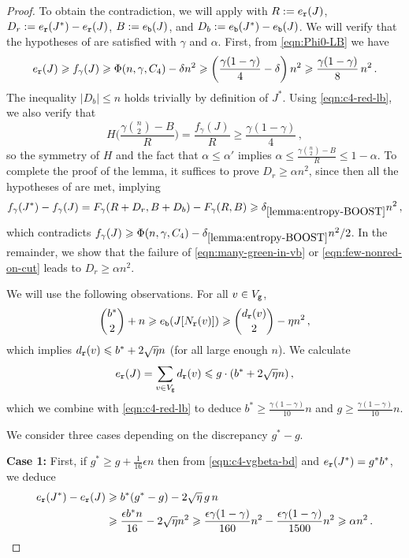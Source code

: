 \begin{proof}
To obtain the contradiction, we will apply  with $R:=e_\red(J)$, $D_r:=e_\red(J^\ast)-e_\red(J)$, $B:=e_\blue(J)$, and $D_b:=e_\blue(J^\ast)-e_\blue(J)$. We will verify that the hypotheses of  are satisfied with $\gamma$ and $\alpha$. First, from \eqref{eqn:Phi0-LB} we have
\begin{equation}\label{eqn:c4-red-lb}
e_\red(J)\geq f_\gamma(J)\geq\Phi(n,\gamma,C_4)-\delta n^2\geq\left(\frac{\gamma(1-\gamma)}{4}-\delta\right)n^2\geq\frac{\gamma(1-\gamma)}{8}\,n^2\,.
\end{equation}
The inequality $|D_b|\leq n$ holds trivially by definition of $J^\ast$. Using \eqref{eqn:c4-red-lb}, we also verify that
$$H\bigg(\frac{\gamma\binom{n}{2}-B}{R}\bigg)=\frac{f_\gamma(J)}{R}\geq\frac{\gamma(1-\gamma)}{4}\,,$$
so the symmetry of $H$ and the fact that $\alpha\leq\alpha'$ implies $\alpha\leq\frac{\gamma\binom{n}{2}-B}{R}\leq1-\alpha$. To complete the proof of the lemma, it suffices to prove $D_r\geq\alpha n^2$, since then all the hypotheses of  are met, implying
$$f_\gamma(J^\ast)-f_\gamma(J)=F_\gamma(R+D_r,B+D_b)-F_\gamma(R,B)\geq\delta_{\ref{lemma:entropy-BOOST}} n^2\,,$$
which contradicts $f_\gamma(J)\geq\Phi(n,\gamma,C_4)-\delta_{\ref{lemma:entropy-BOOST}}n^2/2$. In the remainder, we show that the failure of \eqref{eqn:many-green-in-vb} or \eqref{eqn:few-nonred-on-cut} leads to $D_r\geq\alpha n^2$.

We will use the following observations. For all $v\in V_\green$,
$$\binom{b^\ast}{2}+n\geq e_\blue(J[N_\red(v)])\geq\binom{d_\red(v)}{2}-\eta n^2\,,$$
which implies $d_\red(v)\leq b^\ast+2\sqrt{\eta}n$ (for all large enough $n$). We calculate
\begin{equation}\label{eqn:c4-vgbeta-bd}
e_\red(J)=\sum_{v\in V_\green}d_\red(v)\leq g\cdot(b^\ast+2\sqrt{\eta}n)\,,
\end{equation}
which we combine with \eqref{eqn:c4-red-lb} to deduce $b^\ast\geq\frac{\gamma(1-\gamma)}{10}n$ and $g\geq\frac{\gamma(1-\gamma)}{10}n$.

We consider three cases depending on the discrepancy $g^\ast-g$.

\noindent\textbf{Case 1:} First, if $g^\ast\geq g+{\textstyle\frac{1}{16}}\epsilon n$ then
from \eqref{eqn:c4-vgbeta-bd} and $e_\red(J^\ast)=g^\ast b^\ast$, we deduce
\begin{align*}
e_\red(J^\ast)-e_\red(J)&\geq b^\ast(g^\ast-g)-2\sqrt{\eta}\,g\,n \\
&\geq \frac{\epsilon b^\ast n}{16}-2\sqrt{\eta}n^2\geq\frac{\epsilon\gamma(1-\gamma)}{160}n^2-\frac{\epsilon\gamma(1-\gamma)}{1500}n^2\geq\alpha n^2\,.
\end{align*}


\end{proof}
